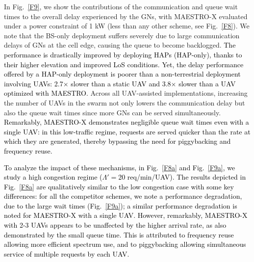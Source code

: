 \documentclass[12pt, draftcls, onecolumn]{IEEEtran}
\theoremstyle{plain}
\theoremstyle{definition}
\theoremstyle{remark}
\newcommand\hlt[1]{\textcolor{black}{#1}}
\begin{document}
In Fig.~\ref{F9}, we show the contributions of the communication and queue wait times to the overall delay experienced by the GNs, with MAESTRO-X evaluated under a power constraint of 1 kW (less than any other scheme, see Fig.~\ref{F8}).
 We note that the BS-only deployment suffers severely due to large
communication delays of GNs at the cell edge, causing the queue to become backlogged. 
 \hlt{The performance is drastically improved by deploying HAPs (HAP-only), thanks to their 
 higher elevation and improved LoS conditions. Yet, the delay performance offered by a HAP-only deployment is poorer than a non-terrestrial deployment involving UAVs: 2.7$\times$ slower than a static UAV and 3.8$\times$ slower than a UAV optimized with MAESTRO.} 
Across all UAV-assisted implementations, %
 increasing the number of UAVs in the swarm not only lowers the communication delay but also the queue wait times since more GNs can be served simultaneously. \hlt{Remarkably, MAESTRO-X demonstrates negligible queue wait times even with a single UAV: in this low-traffic regime, requests are served quicker than the rate at which they are generated, thereby bypassing the need for piggybacking and frequency reuse.}

\hlt{To analyze the impact of these mechanisms, in Fig.~\ref{F8a} and Fig.~\ref{F9a}, we study a high congestion regime ($\Lambda'{=}$20 req/min/UAV).
The results depicted in Fig.~\ref{F8a} are qualitatively similar to the low congestion case with some key differences: for all the competitor schemes, we note a performance degradation, due to the large wait times (Fig.~\ref{F9a}); a similar performance degradation is noted
for MAESTRO-X with a single UAV.
However, remarkably, MAESTRO-X with  2-3 UAVs  appears to be unaffected by the higher arrival rate, as also demonstrated by the small queue time. This is attributed to 
 frequency reuse allowing more efficient spectrum use, and to piggybacking  allowing simultaneous service of multiple requests by each UAV.}
\end{document}
